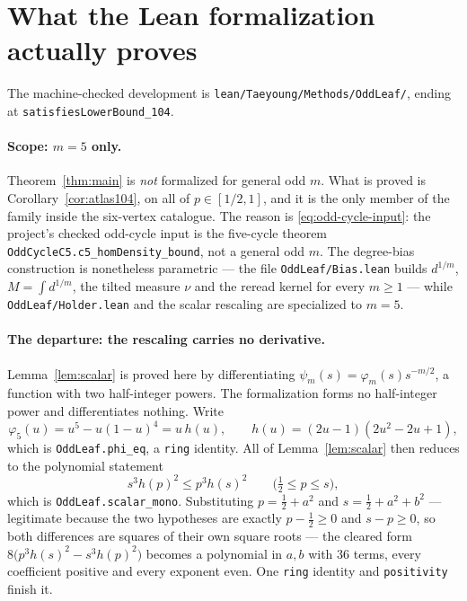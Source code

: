 \documentclass[11pt]{article}
\begin{document}
\section{What the Lean formalization actually proves}

The machine-checked development is \texttt{lean/Taeyoung/Methods/OddLeaf/},
ending at \texttt{satisfiesLowerBound\_104}.

\paragraph{Scope: $m=5$ only.}
Theorem~\ref{thm:main} is \emph{not} formalized for general odd $m$.  What is
proved is Corollary~\ref{cor:atlas104}, on all of $p\in[1/2,1]$, and it is the
only member of the family inside the six-vertex catalogue.  The reason is
\eqref{eq:odd-cycle-input}: the project's checked odd-cycle input is the
five-cycle theorem \texttt{OddCycleC5.c5\_homDensity\_bound}, not a general odd
$m$.  The degree-bias construction is nonetheless parametric --- the file
\texttt{OddLeaf/Bias.lean} builds $d^{1/m}$, $M=\int d^{1/m}$, the tilted
measure $\nu$ and the reread kernel for every $m\geq1$ --- while
\texttt{OddLeaf/Holder.lean} and the scalar rescaling are specialized to $m=5$.

\paragraph{The departure: the rescaling carries no derivative.}
Lemma~\ref{lem:scalar} is proved here by differentiating
$\psi_m(s)=\varphi_m(s)s^{-m/2}$, a function with two half-integer powers.  The
formalization forms no half-integer power and differentiates nothing.  Write
\[
 \varphi_5(u)=u^5-u(1-u)^4=u\,h(u),
 \qquad h(u)=(2u-1)(2u^2-2u+1),
\]
which is \texttt{OddLeaf.phi\_eq}, a \texttt{ring} identity.  All of
Lemma~\ref{lem:scalar} then reduces to the polynomial statement
\begin{equation}
 s^3h(p)^2\leq p^3h(s)^2
 \qquad\bigl(\tfrac12\leq p\leq s\bigr),
 \label{eq:lean-oddleaf-mono}
\end{equation}
which is \texttt{OddLeaf.scalar\_mono}.  Substituting $p=\frac12+a^2$ and
$s=\frac12+a^2+b^2$ --- legitimate because the two hypotheses are exactly
$p-\frac12\geq0$ and $s-p\geq0$, so both differences are squares of their own
square roots --- the cleared form $8\bigl(p^3h(s)^2-s^3h(p)^2\bigr)$ becomes a
polynomial in $a,b$ with $36$ terms, every coefficient positive and every
exponent even.  One \texttt{ring} identity and \texttt{positivity} finish it.
\end{document}
